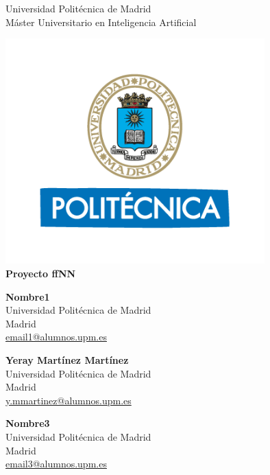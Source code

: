 \begin{center}

\thispagestyle{empty}
\LARGE{Universidad Politécnica de Madrid}\\[2ex]
\large{Máster Universitario en Inteligencia Artificial}\\[2ex]
\vspace{0.3cm}

\begin{center}

\includegraphics[width=10cm]{figures/logo.png}\\
\vspace{0.9cm}
\textbf{\LARGE{Proyecto ffNN}}
\bigskip\bigskip\bigskip\par
\textbf{Nombre1}\\
Universidad Politécnica de Madrid\\
Madrid\\
\url{email1@alumnos.upm.es}
\vspace{1.2cm}\par
\textbf{Yeray Martínez Martínez}\\
Universidad Politécnica de Madrid\\
Madrid\\
\url{y.mmartinez@alumnos.upm.es}
\vspace{1.2cm}\par
\textbf{Nombre3}\\
Universidad Politécnica de Madrid\\
Madrid\\
\url{email3@alumnos.upm.es}

\end{center}

\end{center}